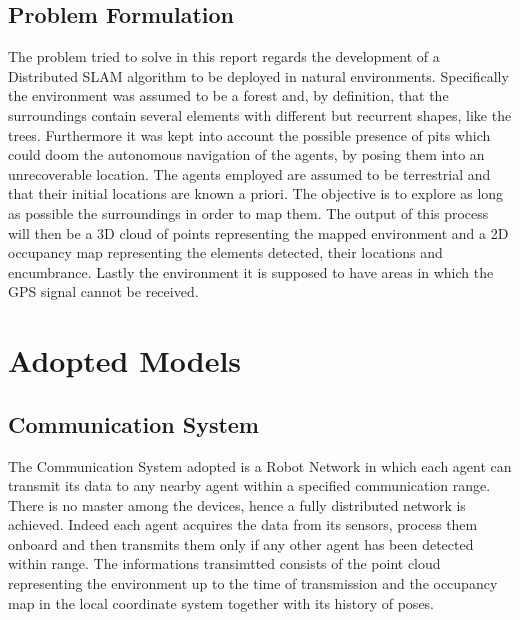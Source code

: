 \documentclass[twocolumn, a4paper]{article}
\begin{document}
\subsection{Problem Formulation}
The problem tried to solve in this report regards the development
of a Distributed SLAM algorithm to be deployed in natural environments.
Specifically the environment was assumed to be a forest and, by definition,
that the surroundings contain several elements with different but recurrent
shapes, like the trees. Furthermore it was kept into account the possible
presence of pits which could doom the autonomous navigation of the agents,
by posing them into an unrecoverable location. The agents employed are
assumed to be terrestrial and that their initial locations are known a
priori. The objective is to explore as long as possible the surroundings
in order to map them. The output of this process will then be a 3D cloud of
points representing the mapped environment and a 2D occupancy map representing
the elements detected, their locations and encumbrance.
Lastly the environment it is supposed to have areas in which the GPS signal
cannot be received.

\section{Adopted Models}
\subsection{Communication System}
The Communication System adopted is a Robot Network in which each agent can
transmit its data to any nearby agent within a specified communication range.
There is no master among the devices, hence a fully distributed network is
achieved. Indeed each agent acquires the data from its sensors, process them
onboard and then transmits them only if any other agent has been detected
within range. The informations transimtted consists of the point cloud
representing the environment up to the time of transmission and the
occupancy map in the local coordinate system together with its history of
poses.
\end{document}
